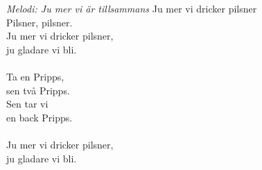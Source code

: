 {\footnotesize\textit{Melodi: Ju mer vi är tillsammans}}
\vspace{10pt}
Ju mer vi dricker pilsner\\
Pilsner, pilsner.\\
Ju mer vi dricker pilsner,\\
ju gladare vi bli.\\
\\
Ta en Pripps,\\
sen två Pripps.\\
Sen tar vi \\
en back Pripps.\\
\\
Ju mer vi dricker pilsner,\\
ju gladare vi bli.
